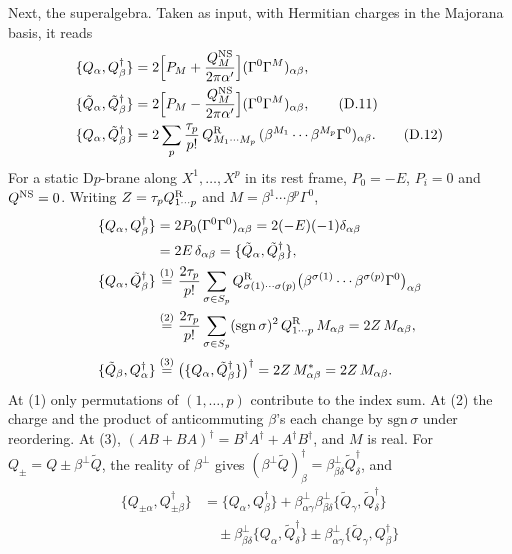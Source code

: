 \begin{tcolorbox}[breakable]
\begin{remark}
Next, the superalgebra. Taken as input, with Hermitian charges in the Majorana basis, it reads
\begin{align}
\{Q_\alpha,Q_\beta^\dagger\} &= 2\Big[P_M + \frac{Q^{\rm NS}_M}{2\pi\alpha'}\Big](\Gamma^0\Gamma^M)_{\alpha\beta}, \notag\\
\{\tilde Q_\alpha,\tilde Q_\beta^\dagger\} &= 2\Big[P_M - \frac{Q^{\rm NS}_M}{2\pi\alpha'}\Big](\Gamma^0\Gamma^M)_{\alpha\beta}, \tag{D.11}\label{alg1}\\
\{Q_\alpha,\tilde Q_\beta^\dagger\} &= 2\sum_p\frac{\tau_p}{p!}\,Q^{\rm R}_{M_1\cdots M_p}\,(\beta^{M_1}\cdots\beta^{M_p}\Gamma^0)_{\alpha\beta}. \tag{D.12}\label{alg2}
\end{align}
For a static D$p$-brane along $X^1,\dots,X^p$ in its rest frame, $P_0 = -E$, $P_i = 0$ and $Q^{\rm NS} = 0$. Writing $Z = \tau_pQ^{\rm R}_{1\cdots p}$ and $M = \beta^1\cdots\beta^p\Gamma^0$,
\begin{align*}
\{Q_\alpha,Q_\beta^\dagger\} &= 2P_0(\Gamma^0\Gamma^0)_{\alpha\beta} = 2(-E)(-1)\delta_{\alpha\beta} \\
&= 2E\,\delta_{\alpha\beta} = \{\tilde Q_\alpha,\tilde Q_\beta^\dagger\}, \\
\{Q_\alpha,\tilde Q_\beta^\dagger\} &\overset{(1)}{=} \frac{2\tau_p}{p!}\sum_{\sigma\in S_p}Q^{\rm R}_{\sigma(1)\cdots\sigma(p)}\big(\beta^{\sigma(1)}\cdots\beta^{\sigma(p)}\Gamma^0\big)_{\alpha\beta}\\
&\overset{(2)}{=} \frac{2\tau_p}{p!}\sum_{\sigma\in S_p}(\mathrm{sgn}\,\sigma)^2\,Q^{\rm R}_{1\cdots p}\,M_{\alpha\beta} = 2Z\,M_{\alpha\beta}, \\
\{\tilde Q_\beta,Q_\alpha^\dagger\} &\overset{(3)}{=} \big(\{Q_\alpha,\tilde Q_\beta^\dagger\}\big)^\dagger = 2Z\,M^*_{\alpha\beta} = 2Z\,M_{\alpha\beta} .
\end{align*}
At (1) only permutations of $(1,\dots,p)$ contribute to the index sum. At (2) the charge and the product of anticommuting $\beta$'s each change by $\mathrm{sgn}\,\sigma$ under reordering. At (3), $(AB+BA)^\dagger = B^\dagger A^\dagger + A^\dagger B^\dagger$, and $M$ is real. For $Q_\pm = Q\pm\beta^\perp\tilde Q$, the reality of $\beta^\perp$ gives $(\beta^\perp\tilde Q)^\dagger_\beta = \beta^\perp_{\beta\delta}\tilde Q^\dagger_\delta$, and
\begin{align*}
\{Q_{\pm\alpha},Q_{\pm\beta}^\dagger\}
&= \{Q_\alpha,Q_\beta^\dagger\} + \beta^\perp_{\alpha\gamma}\beta^\perp_{\beta\delta}\{\tilde Q_\gamma,\tilde Q_\delta^\dagger\} \\
&\quad \pm \beta^\perp_{\beta\delta}\{Q_\alpha,\tilde Q_\delta^\dagger\} \pm \beta^\perp_{\alpha\gamma}\{\tilde Q_\gamma,Q_\beta^\dagger\} \\

\end{align*}
\end{remark}
\end{tcolorbox}
